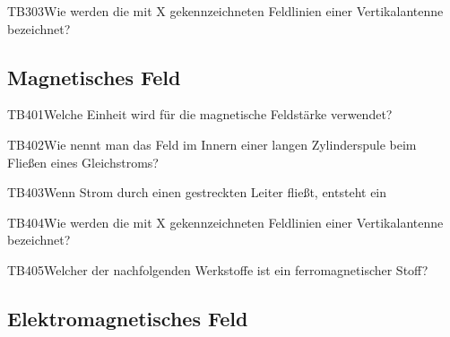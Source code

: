 \begin{question}{TB303}{Wie werden die mit X gekennzeichneten Feldlinien einer Vertikalantenne bezeichnet?}
\end{question}

\subsection{Magnetisches Feld}

\begin{question}{TB401}{Welche Einheit wird für die magnetische Feldstärke verwendet?}
\end{question}

\begin{question}{TB402}{Wie nennt man das Feld im Innern einer langen Zylinderspule beim Fließen eines Gleichstroms?}
\end{question}

\begin{question}{TB403}{Wenn Strom durch einen gestreckten Leiter fließt, entsteht ein}
\end{question}

\begin{question}{TB404}{Wie werden die mit X gekennzeichneten Feldlinien einer Vertikalantenne bezeichnet?}
\end{question}

\begin{question}{TB405}{Welcher der nachfolgenden Werkstoffe ist ein ferromagnetischer Stoff?}
\end{question}

\subsection{Elektromagnetisches Feld}

